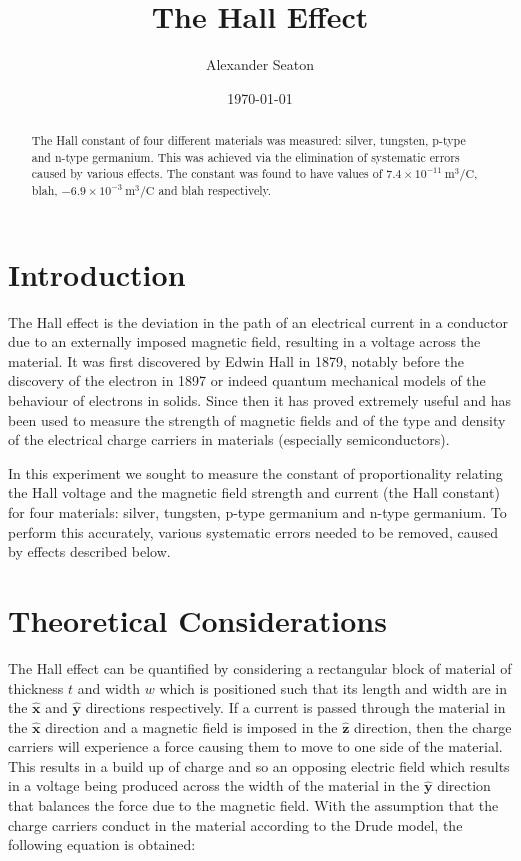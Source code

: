 \documentclass{article}
\title{The Hall Effect}
\date{\today}
\author{Alexander Seaton}
\begin{document}
	\maketitle
	\begin{abstract}
		The Hall constant of four different materials was measured: silver, tungsten, p-type and n-type germanium. This was achieved via the elimination of systematic errors caused by various effects. The constant was found to have values of $7.4\times10^{-11}\SI{}{\cubic\metre\per\coulomb}$, blah, $-6.9\times10^{-3}\SI{}{\cubic\metre\per\coulomb}$ and blah respectively. 
	\end{abstract}
	
	
	\section{Introduction}
		The Hall effect is the deviation in the path of an electrical current in a conductor due to an externally imposed magnetic field, resulting in a voltage across the material. It was first discovered by Edwin Hall in 1879, notably before the discovery of the electron in 1897 or indeed quantum mechanical models of the behaviour of electrons in solids. Since then it has proved extremely useful and has been used to measure the strength of magnetic fields and of the type and density of the electrical charge carriers in materials (especially semiconductors).
		
		In this experiment we sought to measure the constant of proportionality relating the Hall voltage and the magnetic field strength and current (the Hall constant) for four materials: silver, tungsten, p-type germanium and n-type germanium. To perform this accurately, various systematic errors needed to be removed, caused by effects described below.
		
	\section{Theoretical Considerations}
		The Hall effect can be quantified by considering a rectangular block of material of thickness $t$ and width $w$ which is positioned such that its length and width are in the $\hat{\mathbf{x}}$ and $\hat{\mathbf{y}}$ directions respectively. If a current is passed through the material in the $\hat{\mathbf{x}}$ direction and a magnetic field is imposed in the $\hat{\mathbf{z}}$ direction, then the charge carriers will experience a force causing them to move to one side of the material. This results in a build up of charge and so an opposing electric field which results in a voltage being produced across the width of the material in the $\hat{\mathbf{y}}$ direction that balances the force due to the magnetic field. With the assumption that the charge carriers conduct in the material according to the Drude model, the following equation is obtained:
		
\end{document}
